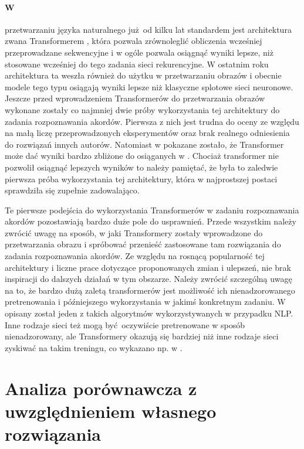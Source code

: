 \paragraph{W} przetwarzaniu języka naturalnego już od kilku lat standardem jest architektura zwana
Transformerem \cite{vaswani_attention_2017}, która pozwala zrównoleglić obliczenia wcześniej
przeprowadzane sekwencyjne i w ogóle pozwala osiągnąć wyniki lepsze, niż stosowane wcześniej do tego
zadania sieci rekurencyjne. W ostatnim roku architektura ta weszła również do użytku w przetwarzaniu
obrazów \cite{dosovitskiy_image_2021} i obecnie modele tego typu osiągają wyniki lepsze niż
klasyczne splotowe sieci neuronowe. Jeszcze przed wprowadzeniem Transformerów do przetwarzania
obrazów wykonane zostały co najmniej dwie próby wykorzystania tej architektury do zadania
rozpoznawania akordów. Pierwsza z nich \cite{chen_harmony_2019} jest trudna do oceny ze względu na
małą liczę przeprowadzonych eksperymentów oraz brak realnego odniesienia do rozwiązań innych
autorów. Natomiast w \cite{park_bi-directional_2019} pokazane zostało, że Transformer może dać
wyniki bardzo zbliżone do osiąganych w \cite{korzeniowski_fully_2016}. Chociaż transformer nie
pozwolił osiągnąć lepszych wyników to należy pamiętać, że była to zaledwie pierwsza próba
wykorzystania tej architektury, która w najprostszej postaci sprawdziła się zupełnie zadowalająco.

Te pierwsze podejścia do wykorzystania Transformerów w zadaniu rozpoznawania akordów pozostawiają
bardzo duże pole do usprawnień. Przede wszystkim należy zwrócić uwagę na sposób, w jaki Transformery
zostały wprowadzone do przetwarzania obrazu \cite{dosovitskiy_image_2021} i spróbować przenieść
zastosowane tam rozwiązania do zadania rozpoznawania akordów. Ze względu na rosnącą popularność tej
architektury i liczne prace dotyczące proponowanych zmian i ulepszeń, nie brak inspiracji do
dalszych działań w tym obszarze. Należy zwrócić szczególną uwagę na to, że bardzo dużą zaletą
transformerów jest możliwość ich nienadzorowanego pretrenowania i późniejszego wykorzystania w
jakimś konkretnym zadaniu. W \cite{devlin_bert_2019} opisany został jeden z takich algorytmów
wykorzystywanych w przypadku NLP. Inne rodzaje sieci też mogą być oczywiście pretrenowane w sposób
nienadzorowany, ale Transformery okazują się bardziej niż inne rodzaje sieci zyskiwać na takim
treningu, co wykazano np. w \cite{caron_emerging_2021}.


\section{Analiza porównawcza z uwzględnieniem własnego rozwiązania}

